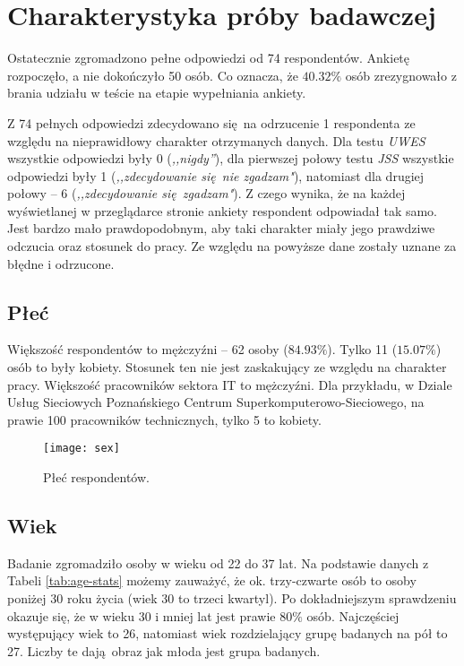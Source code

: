 \chapter{Charakterystyka próby badawczej} 
\label{sec:group}
Ostatecznie zgromadzono pełne odpowiedzi od 74 respondentów. Ankietę rozpoczęło, a nie dokończyło 50 osób. Co oznacza, że $40.32\%$ osób zrezygnowało z brania udziału w teście na etapie wypełniania ankiety. 

Z 74 pełnych odpowiedzi zdecydowano się na odrzucenie 1 respondenta ze względu na nieprawidłowy charakter otrzymanych danych. Dla testu \emph{UWES} wszystkie odpowiedzi były 0 (\textit{,,nigdy''}), dla pierwszej połowy testu \emph{JSS} wszystkie odpowiedzi były 1 (\textit{,,zdecydowanie się nie zgadzam"}), natomiast dla drugiej połowy -- 6 (\textit{,,zdecydowanie się zgadzam"}). Z czego wynika, że na każdej wyświetlanej w przeglądarce stronie ankiety respondent odpowiadał tak samo. Jest bardzo mało
prawdopodobnym, aby taki charakter miały jego prawdziwe odczucia oraz stosunek do pracy. Ze względu na powyższe dane zostały uznane za błędne i odrzucone.
\section{Płeć}
Większość respondentów to mężczyźni -- 62 osoby ($84.93\%$). Tylko 11 ($15.07\%$) osób to były kobiety. Stosunek ten nie jest zaskakujący ze względu na charakter pracy. Większość pracowników sektora IT to mężczyźni. Dla przykładu, w Dziale Usług Sieciowych Poznańskiego Centrum Superkomputerowo-Sieciowego, na prawie 100 pracowników technicznych, tylko 5 to kobiety.

\begin{figure}[h]
\begin{center}
\texttt{[image: sex]}
\end{center}
\caption{Płeć respondentów.}
\label{fig:sex}
\end{figure}

\section{Wiek}
\label{sec:group-age}

Badanie zgromadziło osoby w wieku od 22 do 37 lat. Na podstawie danych z Tabeli \ref{tab:age-stats} możemy zauważyć, że ok. trzy-czwarte osób to osoby poniżej 30 roku życia (wiek 30 to trzeci kwartyl). Po dokładniejszym sprawdzeniu okazuje się, że w wieku 30 i mniej lat jest prawie $80\%$ osób.  Najczęściej występujący wiek to 26, natomiast wiek rozdzielający grupę badanych na pół to 27. Liczby te dają obraz jak młoda jest grupa badanych. 

